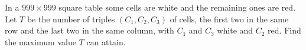 In a $999 \times 999$ square table some cells are white and the remaining ones are red. Let $T$ be the number of triples $(C_1, C_2, C_3)$ of cells, the first two in the same row and the last two in the same column, with $C_1$ and $C_3$ white and $C_2$ red. Find the maximum value $T$ can attain.
